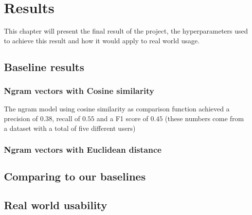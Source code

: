 \chapter{Results}\label{chap:results}
This chapter will present the final result of the project, the hyperparameters used to achieve this result and how it would apply to real world usage.
\section{Baseline results}
\subsection{Ngram vectors  with Cosine similarity}
The ngram model using cosine similarity as comparison function achieved a precision of $0.38$, recall of $0.55$ and a F1 score of $0.45$ (these numbers come from a dataset with a total of five different users)

\subsection{Ngram vectors with Euclidean distance}

\section{Comparing to our baselines}
\section{Real world usability}